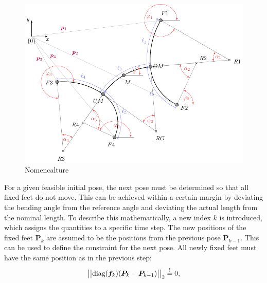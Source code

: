 \documentclass[10pt,a4paper]{article}
\newcommand{\mbeq}{\overset{!}{=}}
\begin{document}
\begin{figure}
\centering\includegraphics[scale=1]{../Pics/model/model.pdf}
\caption{Nomencalture}
\label{fig:model}
\end{figure}

For a given feasible initial pose, the next pose must be determined so that all fixed feet do not move.
This can be achieved within a certain margin by deviating the bending angle from the reference angle and deviating the actual length from the nominal length.
To describe this mathematically, a new index $k$ is introduced, which assigns the quantities to a specific time step.
The new positions of the fixed feet $\bm{P}_{k}$ are assumed to be the positions from the previous pose $\bm{P}_{k-1}$.
This can be used to define the constraint for the next pose.
All newly fixed feet must have the same position as in the previous step:
\begin{equation}
\big|\big|\textnormal{diag}(\bm{f}_k)(\bm{P}_{k} - \bm{P}_{k-1})\big|\big|_2 \mbeq 0,
\label{eq:constraint}
\end{equation}



\end{document}

